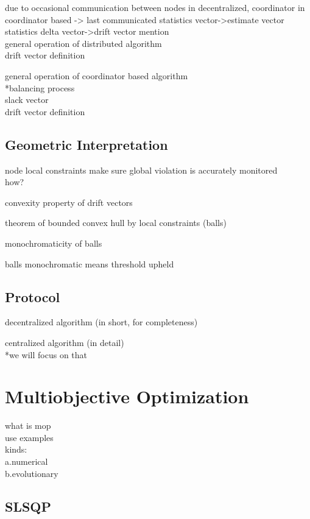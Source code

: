 due to occasional communication between nodes in decentralized, coordinator in coordinator based -> last communicated statistics vector->estimate vector\\

statistics delta vector->drift vector mention\\

general operation of distributed algorithm\\
	drift vector definition

general operation of coordinator based algorithm\\
	*balancing process\\
		slack vector\\
	drift vector definition

\subsection{Geometric Interpretation} \label{subsec:theorBack-GM-geomInt}

node local constraints make sure global violation is accurately monitored\\
how?

convexity property of drift vectors

theorem of bounded convex hull by local constraints (balls)

monochromaticity of balls

balls monochromatic means threshold upheld


\subsection{Protocol} \label{subsec:theorBack-GM-protocol}

decentralized algorithm (in short, for completeness)

centralized algorithm (in detail)\\
*we will focus on that


\section{Multiobjective Optimization} \label{sec:theorBack-MOP}

what is mop\\
use examples\\
kinds:\\
	a.numerical\\
	b.evolutionary
\subsection{SLSQP} \label{subsec:theorBack-SLSQP}


